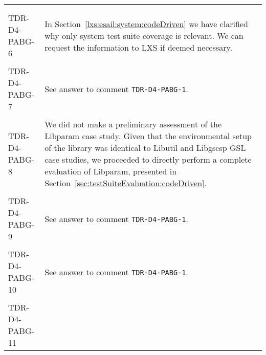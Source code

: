 \begin{longtable}{|p{2cm}|p{12cm}|@{}}
\begin{minipage}{12cm}
\end{minipage}\\
\\
\hline
TDR-D4-PABG-6&
\begin{minipage}{12cm}
In Section~\ref{lxs:esail:system:codeDriven} we have clarified why only system test suite coverage is relevant.
We can request the information to LXS if deemed necessary.
\end{minipage}\\
\\
\hline
TDR-D4-PABG-7&
\begin{minipage}{12cm}
See answer to comment \texttt{TDR-D4-PABG-1}.
\end{minipage}\\
\\
\hline
TDR-D4-PABG-8&
\begin{minipage}{12cm}
We did not make a preliminary assessment of the Libparam case study. Given that the environmental setup of the library was identical to Libutil and Libgscsp GSL case studies, we proceeded to directly perform a complete evaluation of Libparam, presented in Section~\ref{sec:testSuiteEvaluation:codeDriven}.
\end{minipage}\\
\\
\hline
TDR-D4-PABG-9&
\begin{minipage}{12cm}
See answer to comment \texttt{TDR-D4-PABG-1}.
\end{minipage}\\
\\
\hline
TDR-D4-PABG-10&
\begin{minipage}{12cm}
See answer to comment \texttt{TDR-D4-PABG-1}.
\end{minipage}\\
\\
\hline
TDR-D4-PABG-11&
\begin{minipage}{12cm}

\end{minipage}
\end{longtable}
